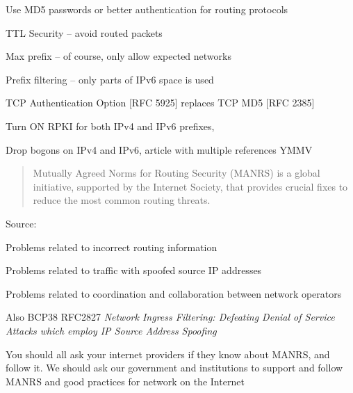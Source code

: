 \documentclass[Screen16to9,17pt]{foils}
\newcommand{\myalert}{\color{red}\faFlag}
\begin{document}
\begin{list2}
\item Use MD5 passwords or better authentication for routing protocols {\myalert}
\item TTL Security -- avoid routed packets
\item Max prefix -- of course, only allow expected networks
\item Prefix filtering -- only parts of IPv6 space is used
\item TCP Authentication Option [RFC 5925] replaces TCP MD5 [RFC 2385]
\item Turn ON RPKI for both IPv4 and IPv6 prefixes, {\myalert} \\
\item Drop bogons on IPv4 and IPv6, article with multiple references YMMV\\
\end{list2}




\begin{quote}
  Mutually Agreed Norms for Routing Security (MANRS) is a global initiative, supported by the Internet Society, that provides crucial fixes to reduce the most common routing threats. ﻿
\end{quote}
Source: {\small{}}

\begin{list2}
\item Problems related to incorrect routing information
\item Problems related to traffic with spoofed source IP addresses
\item Problems related to coordination and collaboration between network operators
\item Also BCP38 RFC2827 \emph{Network Ingress Filtering: Defeating Denial of Service Attacks
which employ IP Source Address Spoofing}
\end{list2}

You should all ask your internet providers if they know about MANRS, and follow it. We should ask our government and institutions to support and follow MANRS and good practices for network on the Internet
\end{document}
